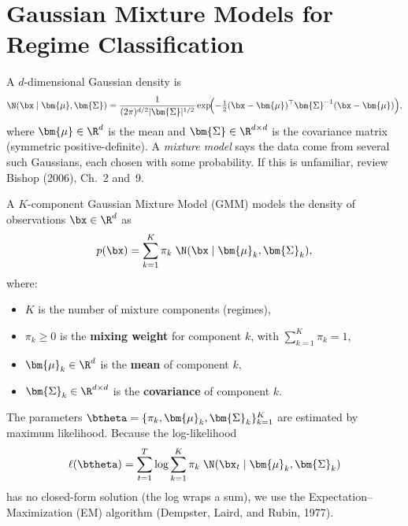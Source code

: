 \section{Gaussian Mixture Models for Regime Classification}
\label{sec:regimes:gmm}

\begin{prereq}
A $d$-dimensional Gaussian density is
\[
  \N(\bx \mid \bm{\mu}, \bm{\Sigma})
  = \frac{1}{(2\pi)^{d/2} |\bm{\Sigma}|^{1/2}}
    \exp\!\Bigl(-\tfrac{1}{2}(\bx - \bm{\mu})^\top \bm{\Sigma}^{-1}
    (\bx - \bm{\mu})\Bigr),
\]
where $\bm{\mu} \in \R^d$ is the mean and
$\bm{\Sigma} \in \R^{d \times d}$ is the covariance matrix
(symmetric positive-definite).  A \emph{mixture model} says the data
come from several such Gaussians, each chosen with some probability.
If this is unfamiliar, review Bishop (2006), Ch.~2 and~9.
\end{prereq}

\begin{definition}
A $K$-component Gaussian Mixture Model (GMM) models the density of
observations $\bx \in \R^d$ as
\begin{equation}
  p(\bx) = \sum_{k=1}^{K} \pi_k \; \N(\bx \mid \bm{\mu}_k, \bm{\Sigma}_k),
  \label{eq:gmm}
\end{equation}
where:
\begin{itemize}[leftmargin=1.5em]
  \item $K$ is the number of mixture components (regimes),
  \item $\pi_k \geq 0$ is the \textbf{mixing weight} for component $k$,
        with $\sum_{k=1}^K \pi_k = 1$,
  \item $\bm{\mu}_k \in \R^d$ is the \textbf{mean} of component $k$,
  \item $\bm{\Sigma}_k \in \R^{d \times d}$ is the \textbf{covariance}
        of component $k$.
\end{itemize}
\end{definition}

The parameters $\btheta = \{\pi_k, \bm{\mu}_k, \bm{\Sigma}_k\}_{k=1}^K$
are estimated by maximum likelihood.  Because the log-likelihood
\[
  \ell(\btheta) = \sum_{t=1}^{T} \log \sum_{k=1}^{K} \pi_k \;
  \N(\bx_t \mid \bm{\mu}_k, \bm{\Sigma}_k)
\]
has no closed-form solution (the log wraps a sum), we use the
Expectation--Maximization (EM) algorithm
(Dempster, Laird, and Rubin, 1977).

